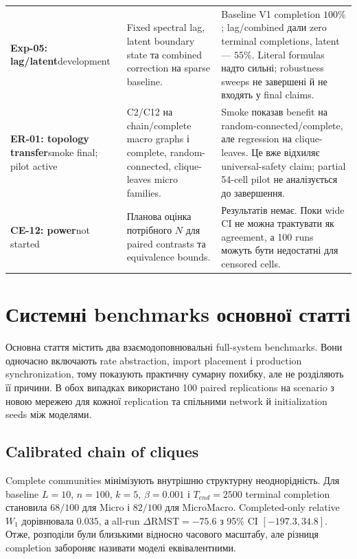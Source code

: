 \documentclass[11pt,a4paper]{article}
\begin{document}
\begin{longtable}{p{2.25cm}p{5.25cm}p{6.15cm}}
\textbf{Exp-05: lag/latent}\newline development
& Fixed spectral lag, latent boundary state та combined correction на sparse baseline.
& Baseline V1 completion $100\%$; lag/combined дали zero terminal completions, latent --- $55\%$. Literal formulas надто сильні; robustness sweeps не завершені й не входять у final claims.\\

\textbf{ER-01: topology transfer}\newline smoke final; pilot active
& C2/C12 на chain/complete macro graphs і complete, random-connected, clique-leaves micro families.
& Smoke показав benefit на random-connected/complete, але regression на clique-leaves. Це вже відхиляє universal-safety claim; partial 54-cell pilot не аналізується до завершення.\\

\textbf{CE-12: power}\newline not started
& Планова оцінка потрібного $N$ для paired contrasts та equivalence bounds.
& Результатів немає. Поки wide CI не можна трактувати як agreement, а 100 runs можуть бути недостатні для censored cells.\\
\bottomrule
\end{longtable}
\normalsize

\section{Системні benchmarks основної статті}

Основна стаття містить два взаємодоповнювальні full-system benchmarks. Вони
одночасно включають rate abstraction, import placement і production
synchronization, тому показують практичну сумарну похибку, але не розділяють її
причини. В обох випадках використано 100 paired replications на scenario з
новою мережею для кожної replication та спільними network й initialization
seeds між моделями.

\subsection{Calibrated chain of cliques}

Complete communities мінімізують внутрішню структурну неоднорідність. Для
baseline $L=10$, $n=100$, $k=5$, $\beta=0.001$ і $T_{end}=2500$ terminal
completion становила $68/100$ для Micro і $82/100$ для MicroMacro. Completed-only
relative $W_1$ дорівнювала $0.035$, а all-run $\Delta\mathrm{RMST}=-75.6$ з
95\% CI $[-197.3,34.8]$. Отже, розподіли були близькими відносно часового
масштабу, але різниця completion забороняє називати моделі еквівалентними.
\end{document}
